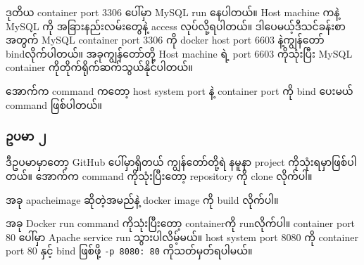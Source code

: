 ဒုတိယ container port 3306 ပေါ်မှာ MySQL run နေပါတယ်။ Host machine ကနဲ့
MySQL ကို အခြားနည်းလမ်းတွေနဲ့ access လုပ်လို့ရပါတယ်။
ဒါပေမယ့်ဒီသင်ခန်းစာအတွက် MySQL container port 3306 ကို docker host port
6603 နဲ့ကျွန်တော် bindလိုက်ပါတယ်။ အခုကျွန်တော်တို့ Host machine ရဲ့ port
6603 ကိုသုံးပြီး MySQL container ကိုတိုက်ရိုက်ဆက်သွယ်နိုင်ပါတယ်။

အောက်က command ကတော့ host system port နဲ့ container port ကို bind ပေးမယ်
command ဖြစ်ပါတယ်။

\begin{Shaded}
\begin{Highlighting}[]
\NormalTok{$ }
\NormalTok{$ }
\end{Highlighting}
\end{Shaded}

\hypertarget{ux1025ux1015ux1019ux102c-ux1042}{%
\subsubsection{ဥပမာ ၂}\label{ux1025ux1015ux1019ux102c-ux1042}}

ဒီဥပမာမှာတော့ GitHub ပေါ်မှာရှိတယ် ကျွန်တော်တို့ရဲ နမူနာ project
ကိုသုံးရမှာဖြစ်ပါတယ်။ အောက်က command ကိုသုံးပြီးတော့ repository ကို
clone လိုက်ပါ။

\begin{Shaded}
\begin{Highlighting}[]
\NormalTok{$ }
\NormalTok{$ }
\end{Highlighting}
\end{Shaded}

အခု apacheimage ဆိုတဲ့အမည်နဲ့ docker image ကို build လိုက်ပါ။

\begin{Shaded}
\begin{Highlighting}[]
\NormalTok{$ }
\end{Highlighting}
\end{Shaded}

အခု Docker run command ကိုသုံးပြီး‌တော့ containerကို runလိုက်ပါ။
container port 80 ပေါ်မှာ Apache service run သွားပါလိမ့်မယ်။ host system
port 8080 ကို container port 80 နှင့် bind ဖြစ်ဖို့
\texttt{-p\ 8080:\ 80} ကိုသတ်မှတ်ရပါမယ်။

\begin{Shaded}
\begin{Highlighting}[]
\NormalTok{$ }
\end{Highlighting}
\end{Shaded}

